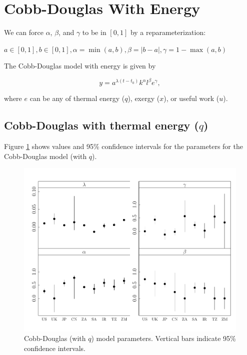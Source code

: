 \documentclass[preprint,authoryear,12pt]{elsarticle}\usepackage{graphicx, color}
\makeatletter
\def\maxwidth{ %
  \ifdim\Gin@nat@width>\linewidth
    \linewidth
  \else
    \Gin@nat@width
  \fi
}
\newenvironment{knitrout}{}{} %
\makeatother
\begin{document}
\section{Cobb-Douglas With Energy}

We can force $\alpha$, $\beta$, and $\gamma$ to be in $[0,1]$ by a reparameterization:

$a \in[0,1], b \in [0,1], \alpha=\min(a,b), \beta=|b-a|, \gamma = 1-\max(a,b)$

The Cobb-Douglas model with energy is given by

\begin{equation} \label{eq:CD_With_Energy}
  y = a^{\lambda (t-t_0)}k^{\alpha}l^{\beta}e^{\gamma},
\end{equation}

\noindent where $e$ can be any of thermal energy ($q$), exergy ($x$), or useful work ($u$).

\subsection{Cobb-Douglas with thermal energy ($q$)}

Figure \ref{fig:CDq_Params_Graph} shows values and 95\% confidence intervals for the parameters for the Cobb-Douglas model (with $q$).

\begin{knitrout}
\color{fgcolor}\begin{figure}[H]

\includegraphics[width=\maxwidth]{figure/CDq_Params_Graph} \caption[Cobb-Douglas (with $q$) model parameters]{Cobb-Douglas (with $q$) model parameters. Vertical bars indicate 95\% confidence intervals.\label{fig:CDq_Params_Graph}}
\end{figure}


\end{knitrout}
\end{document}
